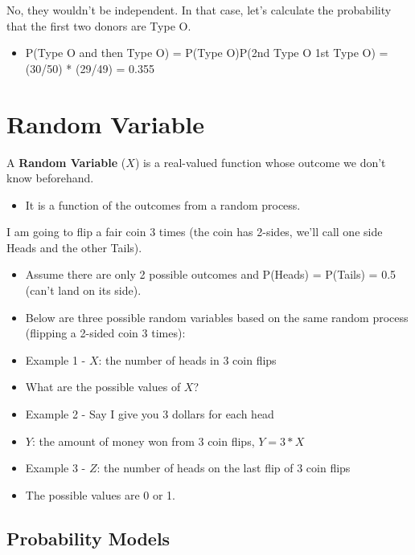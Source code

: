 \documentclass[]{book}
\providecommand{\tightlist}{%
  \setlength{\itemsep}{0pt}\setlength{\parskip}{0pt}}
\begin{document}
No, they wouldn't be independent. In that case, let's calculate the probability that the first two donors are Type O.

\begin{itemize}
\tightlist
\item
  P(Type O and then Type O) = P(Type O)P(2nd Type O \textbar{} 1st Type O) = (30/50) * (29/49) = 0.355
\end{itemize}

\hypertarget{random-variable-1}{%
\section{Random Variable}\label{random-variable-1}}

A \textbf{Random Variable} (\(X\)) is a real-valued function whose outcome we don't know beforehand.

\begin{itemize}
\tightlist
\item
  It is a function of the outcomes from a random process.
\end{itemize}

I am going to flip a fair coin 3 times (the coin has 2-sides, we'll call one side Heads and the other Tails).

\begin{itemize}
\item
  Assume there are only 2 possible outcomes and P(Heads) = P(Tails) = 0.5 (can't land on its side).
\item
  Below are three possible random variables based on the same random process (flipping a 2-sided coin 3 times):
\item
  Example 1 - \(X\): the number of heads in 3 coin flips
\item
  What are the possible values of \(X\)?
\item
  Example 2 - Say I give you 3 dollars for each head
\item
  \(Y\): the amount of money won from 3 coin flips, \(Y = 3*X\)
\item
  Example 3 - \(Z\): the number of heads on the last flip of 3 coin flips
\item
  The possible values are 0 or 1.
\end{itemize}

\hypertarget{probability-models-1}{%
\subsection{Probability Models}\label{probability-models-1}}
\end{document}
